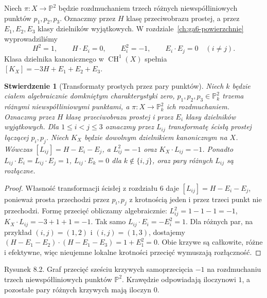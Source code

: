 \documentclass[11pt,a4paper,openany]{report}
\numberwithin{equation}{section}
\theoremstyle{plain}
\newtheorem{stwierdzenie}[twierdzenie]{Stwierdzenie}
\theoremstyle{definition}
\theoremstyle{remark}
\newcommand{\PP}{\mathbb P}
\begin{document}
Niech $\pi:X\to\PP^2$ będzie rozdmuchaniem
trzech różnych niewspółliniowych punktów $p_1,p_2,p_3$.
Oznaczmy przez $H$ klasę przeciwobrazu prostej,
a przez $E_1,E_2,E_3$ klasy dzielników wyjątkowych.
W rozdziale~\ref{ch:ga6-powierzchnie} wyprowadziliśmy
\[
H^2=1,\qquad H\cdot E_i=0,\qquad
E_i^2=-1,\qquad E_i\cdot E_j=0\quad(i\ne j).
\]
Klasa dzielnika kanonicznego w $\operatorname{CH}^1(X)$ spełnia
$[K_X]=-3H+E_1+E_2+E_3$.

\begin{stwierdzenie}[Transformaty prostych przez pary punktów]
\label{st:ga8-hexagon}
Niech $k$ będzie ciałem algebraicznie domkniętym
charakterystyki zero, $p_1,p_2,p_3\in\PP^2_k$ trzema
różnymi niewspółliniowymi punktami, a
$\pi:X\to\PP^2_k$ ich rozdmuchaniem. Oznaczmy przez
$H$ klasę przeciwobrazu prostej i przez $E_i$ klasy
dzielników wyjątkowych. Dla $1\le i<j\le3$ oznaczmy
przez $L_{ij}$ transformatę ścisłą prostej łączącej
$p_i,p_j$. Niech $K_X$ będzie dowolnym dzielnikiem
kanonicznym na $X$.
Wówczas $[L_{ij}]=H-E_i-E_j$, a
$L_{ij}^2=-1$ oraz $K_X\cdot L_{ij}=-1$.
Ponadto $L_{ij}\cdot E_i=L_{ij}\cdot E_j=1$,
$L_{ij}\cdot E_k=0$ dla $k\notin\{i,j\}$,
oraz pary różnych $L_{ij}$ są rozłączne.
\end{stwierdzenie}
\begin{proof}
Własność transformacji ścisłej z rozdziału 6 daje
$[L_{ij}]=H-E_i-E_j$, ponieważ prosta przechodzi
przez $p_i,p_j$ z krotnością jeden i przez trzeci punkt
nie przechodzi. Formę przecięć obliczamy algebraicznie:
$L_{ij}^2=1-1-1=-1$,
$K_X\cdot L_{ij}=-3+1+1=-1$.
Tak samo $L_{ij}\cdot E_i= -E_i^2=1$.
Dla różnych par, na przykład $(i,j)=(1,2)$ i
$(i,j)=(1,3)$, dostajemy
$(H-E_1-E_2)\cdot(H-E_1-E_3)=1+E_1^2=0$.
Obie krzywe są całkowite, różne i efektywne, więc
nieujemne lokalne krotności przecięć wymuszają
rozłączność.
\end{proof}

\begin{center}

{\small Rysunek 8.2. Graf przecięć sześciu krzywych
samoprzecięcia $-1$ na rozdmuchaniu trzech niewspółliniowych
punktów $\PP^2$. Krawędzie odpowiadają iloczynowi $1$,
a pozostałe pary różnych krzywych mają iloczyn $0$.}\par
\end{center}
\end{document}

